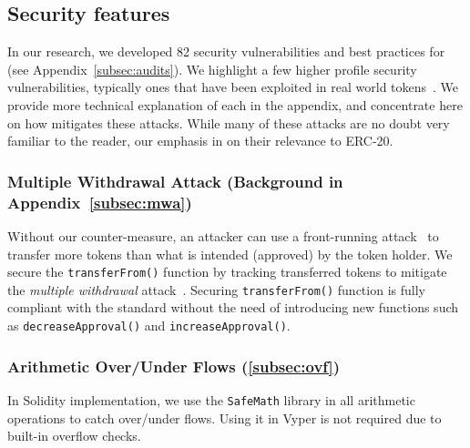 

\subsection{Security features}
In our research, we developed 82 security vulnerabilities and best practices for \erc (see Appendix~\ref{subsec:audits}).  We highlight a few higher profile security vulnerabilities, typically ones that have been exploited in real world \erc tokens~\cite{SolidtySecBlog,EthSecServ,SoliditySecCon,ConsensysSecCon,LandoKL}. We provide more technical explanation of each in the appendix, and concentrate here on how \sys mitigates these attacks. While many of these attacks are no doubt very familiar to the reader, our emphasis in on their relevance to ERC-20.

\subsubsection{Multiple Withdrawal Attack (Background in Appendix~\ref{subsec:mwa})}
Without our counter-measure, an attacker can use a front-running attack~\cite{OrderingAttack,eskandari2019sok} to transfer more tokens than what is intended (approved) by the token holder. We secure the \texttt{transferFrom()} function by tracking transferred tokens to mitigate the \textit{multiple withdrawal} attack~\cite{ERC20MWA}. Securing \texttt{transferFrom()} function is fully compliant with the \erc standard without the need of introducing new functions such as \texttt{decreaseApproval()} and \texttt{increaseApproval()}. 

\subsubsection{Arithmetic Over/Under Flows (\ref{subsec:ovf})} 
In Solidity implementation, we use the \texttt{SafeMath} library in all arithmetic operations to catch over/under flows. Using it in Vyper is not required due to built-in overflow checks.

